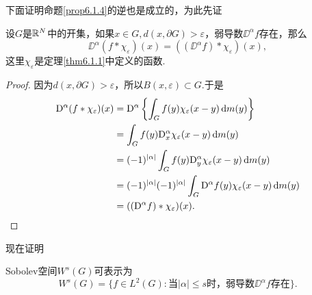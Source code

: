 下面证明命题\ref{prop6.1.4}的逆也是成立的，为此先证
\begin{prop}\label{prop6.1.5}
	设$G$是$\mathbb R^N$中的开集，如果$x\in G,d(x,\partial G)>\varepsilon$，弱导数$\DD^\alpha f$存在，那么
	\[\DD^\alpha(f\ast\chi_\varepsilon)(x)=((\DD^\alpha f)\ast\chi_\varepsilon)(x),\]
	这里$\chi_\varepsilon$是定理\ref{thm6.1.1}中定义的函数.
\end{prop}
\begin{proof}
	因为$d(x,\partial G)>\varepsilon$，所以$B(x,\varepsilon)\subset G$.于是
	\begin{align*}
		\mathrm D^\alpha(f\ast\chi_\varepsilon)(x)
		&=\mathrm D^\alpha\left\{\int_G f(y)\chi_\varepsilon(x-y)\mathop{}\!\mathrm{d} m(y)\right\}\\
		&=\int_G f(y)\mathrm D_x^\alpha \chi_\varepsilon(x-y)\mathop{}\!\mathrm{d} m(y)\\
		&=(-1)^{|\alpha|}\int_G f(y)\mathrm D_y^\alpha \chi_\varepsilon(x-y)\mathop{}\!\mathrm{d} m(y)\\
		&=(-1)^{|\alpha|}(-1)^{|\alpha|}\int_G \mathrm D^\alpha f(y)\chi_\varepsilon(x-y)\mathop{}\!\mathrm{d} m(y)\\
		&=((\mathrm D^\alpha f)\ast\chi_\varepsilon)(x).\qedhere
	\end{align*}
\end{proof}
现在证明
\begin{theorem}\label{thm6.1.6}
	Sobolev空间$W^s(G)$可表示为
	\[W^s(G)=\{f\in L^2(G)\colon\text{当$|\alpha|\le s$时，弱导数$\DD^\alpha f$存在}\}.\]
\end{theorem}
